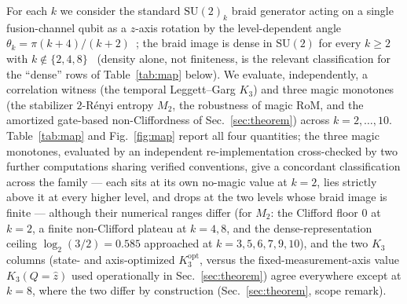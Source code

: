 \documentclass[aps,pra,twocolumn,superscriptaddress,longbibliography,floatfix,nofootinbib]{revtex4-2}
\begin{document}
For each $k$ we consider the standard $\mathrm{SU}(2)_k$ braid
generator acting on a single fusion-channel qubit as a $z$-axis
rotation by the level-dependent angle
$\theta_k=\pi(k+4)/(k+2)$~\cite{FreedmanLarsenWang2002,%
FreedmanLarsenWang2003}; the braid image is dense in
$\mathrm{SU}(2)$ for every $k\ge2$ with $k\notin\{2,4,8\}$~\cite{Kuperberg2011}
(density alone, not finiteness, is the relevant classification for
the ``dense'' rows of Table~\ref{tab:map} below). We evaluate,
independently, a correlation
witness (the temporal Leggett--Garg $K_3$) and three magic monotones
(the stabilizer $2$-Rényi entropy $M_2$, the robustness of magic RoM,
and the amortized gate-based non-Cliffordness of
Sec.~\ref{sec:theorem}) across $k=2,\ldots,10$. Table~\ref{tab:map}
and Fig.~\ref{fig:map} report all four quantities; the three magic
monotones, evaluated by an independent re-implementation cross-checked
by two further computations sharing verified conventions, give a
concordant classification across the family --- each sits at its own
no-magic value at $k=2$, lies strictly above it at every higher level,
and drops at the two levels whose braid image is finite --- although
their numerical ranges differ (for $M_2$: the Clifford floor $0$ at
$k=2$, a finite non-Clifford plateau at $k=4,8$, and the
dense-representation ceiling $\log_2(3/2)=0.585$ approached at
$k=3,5,6,7,9,10$), and the two $K_3$ columns
(state- and axis-optimized $K_3^{\mathrm{opt}}$, versus the
fixed-measurement-axis value $K_3(Q{=}\hat z)$ used operationally in
Sec.~\ref{sec:theorem}) agree everywhere except at $k=8$, where the
two differ by construction (Sec.~\ref{sec:theorem}, scope remark).
\end{document}
